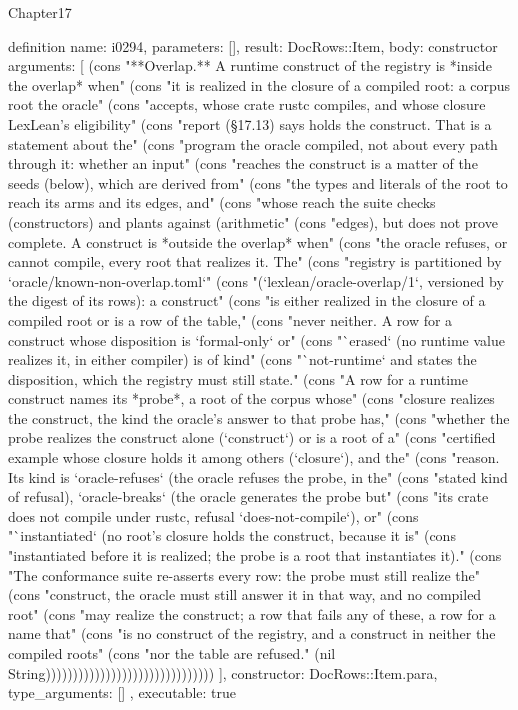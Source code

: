 \begin{lexlean}{Chapter17}
\begin{semanticmodule}
definition{
  name: i0294,
  parameters: [],
  result: DocRows::Item,
  body: constructor{
    arguments: [
      (cons "**Overlap.** A runtime construct of the registry is *inside the overlap* when" (cons "it is realized in the closure of a compiled root: a corpus root the oracle" (cons "accepts, whose crate rustc compiles, and whose closure LexLean's eligibility" (cons "report (§17.13) says holds the construct. That is a statement about the" (cons "program the oracle compiled, not about every path through it: whether an input" (cons "reaches the construct is a matter of the seeds (below), which are derived from" (cons "the types and literals of the root to reach its arms and its edges, and" (cons "whose reach the suite checks (constructors) and plants against (arithmetic" (cons "edges), but does not prove complete. A construct is *outside the overlap* when" (cons "the oracle refuses, or cannot compile, every root that realizes it. The" (cons "registry is partitioned by `oracle/known-non-overlap.toml`" (cons "(`lexlean/oracle-overlap/1`, versioned by the digest of its rows): a construct" (cons "is either realized in the closure of a compiled root or is a row of the table," (cons "never neither. A row for a construct whose disposition is `formal-only` or" (cons "`erased` (no runtime value realizes it, in either compiler) is of kind" (cons "`not-runtime` and states the disposition, which the registry must still state." (cons "A row for a runtime construct names its *probe*, a root of the corpus whose" (cons "closure realizes the construct, the kind the oracle's answer to that probe has," (cons "whether the probe realizes the construct alone (`construct`) or is a root of a" (cons "certified example whose closure holds it among others (`closure`), and the" (cons "reason. Its kind is `oracle-refuses` (the oracle refuses the probe, in the" (cons "stated kind of refusal), `oracle-breaks` (the oracle generates the probe but" (cons "its crate does not compile under rustc, refusal `does-not-compile`), or" (cons "`instantiated` (no root's closure holds the construct, because it is" (cons "instantiated before it is realized; the probe is a root that instantiates it)." (cons "The conformance suite re-asserts every row: the probe must still realize the" (cons "construct, the oracle must still answer it in that way, and no compiled root" (cons "may realize the construct; a row that fails any of these, a row for a name that" (cons "is no construct of the registry, and a construct in neither the compiled roots" (cons "nor the table are refused." (nil String)))))))))))))))))))))))))))))))
    ],
    constructor: DocRows::Item.para,
    type_arguments: []
  },
  executable: true
}


\end{semanticmodule}
\end{lexlean}
